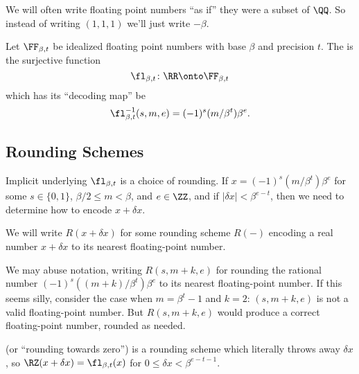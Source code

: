 \begin{rmk}
We will often write floating point numbers ``as if'' they were a subset
of $\QQ$. So instead of writing $(1,1,1)$ we'll just write $-\beta$.
\end{rmk}

\begin{defn}
Let $\FF_{\beta,t}$ be idealized floating point numbers with base
$\beta$ and precision $t$. The  is the surjective
function
\begin{equation}
  \fl_{\beta,t}\colon\RR\onto\FF_{\beta,t}
\end{equation}
which has its ``decoding map'' be
\begin{equation}
  \fl_{\beta,t}^{-1}(s,m,e) = (-1)^{s}(m/\beta^{t})\beta^{e}.
\end{equation}
\end{defn}

\subsection{Rounding Schemes}

\begin{rmk}
  Implicit underlying $\fl_{\beta,t}$ is a choice of rounding. If
  $x = (-1)^{s}(m/\beta^{t})\beta^{e}$ for some $s\in\{0,1\}$,
  $\beta/2\leq m<\beta$, and $e\in\ZZ$, and if $|\delta x| < \beta^{e-t}$,
  then we need to determine how to encode $x + \delta x$.

  We will write $R(x+\delta x)$ for some rounding scheme $R(-)$ encoding
  a real number $x+\delta x$ to its nearest floating-point number.
\end{rmk}
\begin{notation}
  We may abuse notation, writing $R(s,m+k,e)$ for rounding the rational
  number $(-1)^{s}((m+k)/\beta^{t})\beta^{e}$ to its nearest
  floating-point number. If this seems silly, consider the case when
  $m=\beta^{t}-1$ and $k=2$: $(s,m+k,e)$ is not a valid floating-point
  number. But $R(s,m+k,e)$ would produce a correct floating-point
  number, rounded as needed.
\end{notation}

\begin{defn}
   (or ``rounding towards zero'') is a rounding
  scheme which literally throws away
  $\delta x$, so
  $\RZ(x+\delta x)=\fl_{\beta,t}(x)$ for $0\leq\delta x<\beta^{e-t-1}$.
\end{defn}



